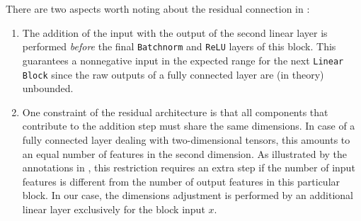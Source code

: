 There are two aspects worth noting about the residual connection in :
\begin{enumerate}
  \item The addition of the input with the output of the second linear layer is performed \emph{before} the final \texttt{Batchnorm} and \texttt{ReLU} layers of this block.
        This guarantees a nonnegative input in the expected range for the next \texttt{Linear Block} since the raw outputs of a fully connected layer are (in theory) unbounded.

  \item One constraint of the residual architecture is that all components that contribute to the addition step must share the same dimensions.
        In case of a fully connected layer dealing with two-dimensional tensors, this amounts to an equal number of features in the second dimension.
        As illustrated by the annotations in , this restriction requires an extra step if the number of input features is different from the number of output features in this particular block.
        In our case, the dimensions adjustment is performed by an additional linear layer exclusively for the block input $x$.
\end{enumerate}

